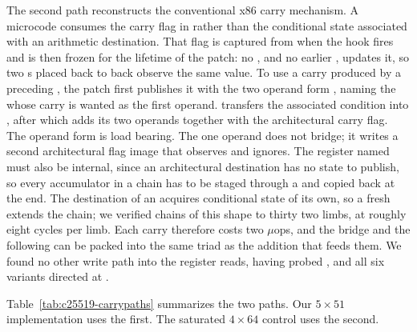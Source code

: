 The second path reconstructs the conventional x86 carry mechanism.
A microcode  consumes the carry flag in  rather than the conditional state associated with an arithmetic destination.
That flag is captured from  when the hook fires and is then frozen for the lifetime of the patch: no , and no earlier , updates it, so two s placed back to back observe the same value.
To use a carry produced by a preceding , the patch first publishes it with the two operand form , naming the  whose carry is wanted as the first operand.
 transfers the associated condition into , after which  adds its two operands together with the architectural carry flag.
The operand form is load bearing.
The one operand  does not bridge; it writes a second architectural flag image that  observes and  ignores.
The register named must also be internal, since an architectural destination has no state to publish, so every accumulator in a chain has to be staged through a  and copied back at the end.
The destination of an  acquires conditional state of its own, so a fresh  extends the chain; we verified chains of this shape to thirty two limbs, at roughly eight cycles per limb.
Each carry therefore costs two $\mu$ops, and the bridge and the following  can be packed into the same triad as the addition that feeds them.
We found no other write path into the register  reads, having probed ,  and all six  variants directed at .

Table~\ref{tab:c25519-carrypaths} summarizes the two paths.
Our $5\times51$ implementation uses the first.
The saturated $4\times64$ control uses the second.


